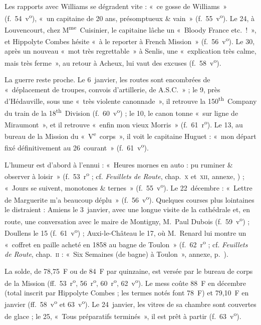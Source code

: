 Les rapports avec Williams se dégradent vite : «~ce gosse de Williams~» (f.~54~v\textsuperscript{o}), «~un capitaine de 20 ans, présomptueux \& vain~» (f.~55~v\textsuperscript{o}). Le 24, à Louvencourt, chez M\textsuperscript{me}~Cuisinier, le capitaine lâche un «~Bloody France etc.~!~», et Hippolyte Combes hésite «~à le reporter à French Mission~» (f.~56~v\textsuperscript{o}). Le 30, après un nouveau «~mot très regrettable~» à Senlis, une «~explication très calme, mais très ferme~», au retour à Acheux, lui vaut des excuses (f.~58~v\textsuperscript{o}).

La guerre reste proche. Le 6~janvier, les routes sont encombrées de «~déplacement de troupes, convois d'artillerie, de A.S.C.~» ; le 9, près d'Hédauville, sous une «~très violente canonnade~», il retrouve la 150\textsuperscript{th}~Company du train de la 18\textsuperscript{th}~Division (f.~60~v\textsuperscript{o}) ; le 10, le canon tonne «~sur ligne de Miraumont~», et il retrouve «~enfin mon vieux Morris~» (f.~61~r\textsuperscript{o}). Le 13, au bureau de la Mission du «~V\textsuperscript{e}~corps~», il voit le capitaine Huguet : «~mon départ fixé définitivement au 26~courant~» (f.~61~v\textsuperscript{o}).

L'humeur est d'abord à l'ennui : «~Heures mornes en auto : pu ruminer \& observer à loisir~» (f.~53~r\textsuperscript{o} ; cf. \textit{Feuillets de Route}, chap.~\textsc{x} et~\textsc{xii}, annexe, ) ; «~Jours se suivent, monotones \& ternes~» (f.~55~v\textsuperscript{o}). Le 22~décembre : «~Lettre de Marguerite m'a beaucoup déplu~» (f.~56~v\textsuperscript{o}). Quelques courses plus lointaines le distraient : Amiens le 3~janvier, avec une longue visite de la cathédrale et, en route, une conversation avec le maire de Montigny, M.~Paul Dubois (f.~59~v\textsuperscript{o}) ; Doullens le 15 (f.~61~v\textsuperscript{o}) ; Auxi-le-Château le 17, où M.~Renard lui montre un «~coffret en paille acheté en 1858 au bagne de Toulon~» (f.~62~r\textsuperscript{o} ; cf. \textit{Feuillets de Route}, chap.~\textsc{ii} : «~Six Semaines (de bagne) à Toulon~», annexe, p.~\pageref{annexe:doc6-ii}).

La solde, de 78,75~F ou de 84~F par quinzaine, est versée par le bureau de corps de la Mission (ff.~53~r\textsuperscript{o}, 56~r\textsuperscript{o}, 60~r\textsuperscript{o}, 62~v\textsuperscript{o}). Le mess coûte 88~F en décembre (total inscrit par Hippolyte Combes ; les termes notés font 78~F) et 79,10~F en janvier (ff.~58~v\textsuperscript{o} et 63~v\textsuperscript{o}). Le 24~janvier, les vitres de sa chambre sont couvertes de glace ; le 25, «~Tous préparatifs terminés~», il est prêt à partir (f.~63~v\textsuperscript{o}).

